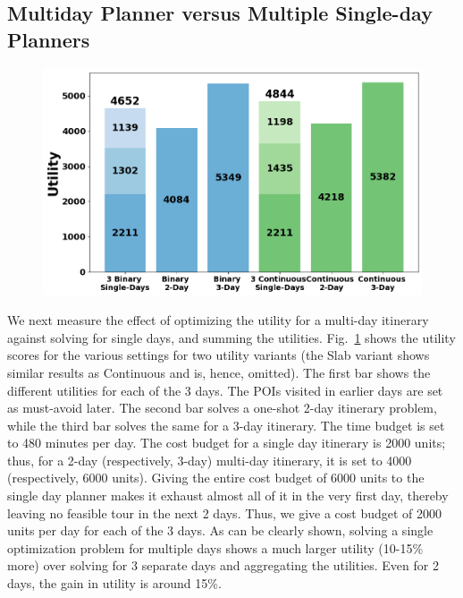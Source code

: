 \subsection{Multiday Planner versus Multiple Single-day Planners}
\label{sec:exp multi-day}

\begin{figure}[t]
\centering
\includegraphics[width=\figwidth]{plots/multivssingle.png}
\label{fig:multi-day}
\end{figure}

We next measure the effect of optimizing the utility for a multi-day itinerary against solving for single days, and summing the utilities.
Fig.~\ref{fig:multi-day} shows the utility scores for the various settings for two utility variants (the Slab variant shows similar results as Continuous and is, hence, omitted).
The first bar shows the different utilities for each of the 3 days. The POIs visited in earlier days are set as must-avoid later.
The second bar solves a one-shot 2-day itinerary problem, while the third bar solves the same for a 3-day itinerary.
The time budget is set to 480 minutes per day.
The cost budget for a single day itinerary is 2000 units; thus, for a 2-day (respectively, 3-day) multi-day itinerary, it is set to 4000 (respectively, 6000 units).
Giving the entire cost budget of 6000 units to the single day planner makes it exhaust almost all of it in the very first day, thereby leaving no feasible tour in the next 2 days.
Thus, we give a cost budget of 2000 units per day for each of the 3 days.
As can be clearly shown, solving a single optimization problem for multiple days shows a much larger utility (10-15\% more) over solving for 3 separate days and aggregating the utilities.
Even for 2 days, the gain in utility is around 15\%.

